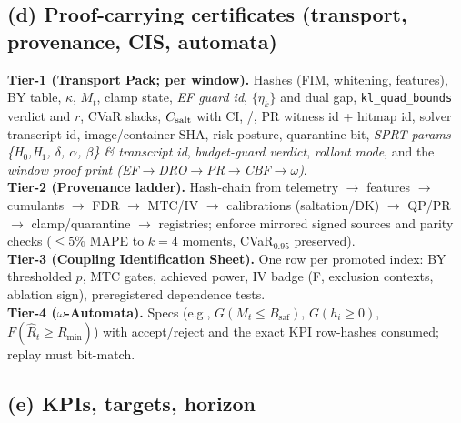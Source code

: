\subsection{(d) Proof-carrying certificates (transport, provenance, CIS, automata)}\label{subsec:ops-pcc}
\emph{}

\begin{definition}\label{def:tierpacks}
\textbf{Tier-1 (Transport Pack; per window).} Hashes (FIM, whitening, features), BY table, $\kappa$, $M_t$, clamp state, \textit{EF guard id}, $\{\eta_k\}$ and dual gap, \texttt{kl\_quad\_bounds} verdict and $r$, CVaR slacks, $C_{\mathrm{salt}}$ with CI, /, PR witness id + hitmap id, solver transcript id, image/container SHA, risk posture, quarantine bit, \textit{SPRT params \{H$_0$,H$_1$, $\delta$, $\alpha$, $\beta$\} \& transcript id}, \textit{budget-guard verdict}, \textit{rollout mode}, and the \textit{window proof print (EF$\rightarrow$DRO$\rightarrow$PR$\rightarrow$CBF$\rightarrow\omega$)}.\\
\textbf{Tier-2 (Provenance ladder).} Hash-chain from telemetry $\to$ features $\to$ cumulants $\to$ FDR $\to$ MTC/IV $\to$ calibrations (saltation/DK) $\to$ QP/PR $\to$ clamp/quarantine $\to$ registries; enforce mirrored signed sources and parity checks ($\le5\%$ MAPE to $k\!=\!4$ moments, CVaR$_{0.95}$ preserved).\\
\textbf{Tier-3 (Coupling Identification Sheet).} One row per promoted index: BY thresholded $p$, MTC gates, achieved power, IV badge (F, exclusion contexts, ablation sign), preregistered dependence tests.\\
\textbf{Tier-4 ($\omega$-Automata).} Specs (e.g., $G(M_t\!\le\!B_{\mathrm{saf}})$, $G(h_i\!\ge\!0)$, $F(\hat R_t\!\ge\!R_{\min})$) with accept/reject and the exact KPI row-hashes consumed; replay must bit-match.
\end{definition}

\subsection{(e) KPIs, targets, horizon}\label{subsec:ops-kpis}
\emph{}

